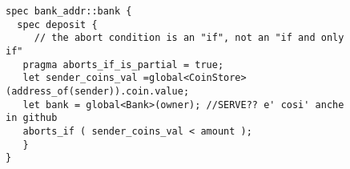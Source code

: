 \begin{figure}[t]
\begin{lstlisting}[language=move,caption={Simplified MSL code for the Bank verification},label={fig:specMove}]
spec bank_addr::bank {
  spec deposit {
     // the abort condition is an "if", not an "if and only if"
   pragma aborts_if_is_partial = true;
   let sender_coins_val =global<CoinStore>(address_of(sender)).coin.value;
   let bank = global<Bank>(owner); //SERVE?? e' cosi' anche in github
   aborts_if ( sender_coins_val < amount );
   }
}
\end{lstlisting}
\end{figure}
